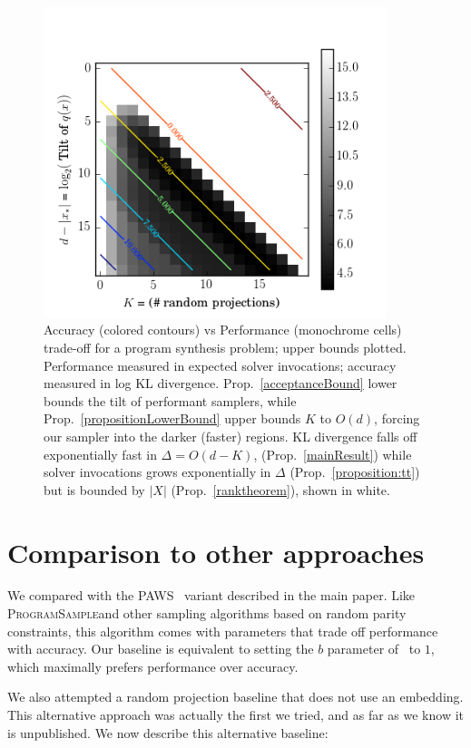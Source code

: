 \documentclass{article}
\newcommand{\theSystem}{\textsc{ProgramSample}}
\begin{document}
  \begin{figure}\centering
    \includegraphics[width=10cm]{trade-off.png}
    \caption{Accuracy (colored contours) vs Performance (monochrome cells) trade-off for a program synthesis problem; upper bounds plotted. Performance measured in expected solver invocations; accuracy measured in log KL divergence. Prop.~\ref{acceptanceBound} lower bounds the tilt of performant samplers, while  Prop.~\ref{propositionLowerBound} upper bounds $K$ to $O(d)$, forcing our sampler into the darker (faster) regions.  KL divergence falls off exponentially fast in $\Delta = O(d - K)$, (Prop.~\ref{mainResult}) while solver invocations grows exponentially in $\Delta$ (Prop.~\ref{proposition:tt}) but is bounded by $|X|$ (Prop.~\ref{ranktheorem}), shown in white.}\label{heat}
\end{figure}
  

  \pagebreak

  \section{Comparison to other approaches}

  We compared with the PAWS~\cite{ermon2013embed} variant
  described in the main paper. Like \theSystem and other sampling algorithms based on random parity constraints,
  this algorithm comes with parameters that trade off performance with accuracy.
  Our baseline is equivalent to setting the $b$ parameter of~\cite{ermon2013embed} to $1$,
  which maximally prefers performance over accuracy.
  

  We also attempted a random projection baseline that does not use an
  embedding. This alternative approach was actually the first we
  tried, and as far as we know it is unpublished.  We now describe
  this alternative baseline:
  
\end{document}

